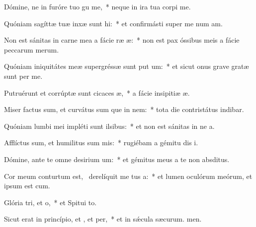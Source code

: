 \item Dómine, ne in furóre tuo gu me,~* neque in ira tua corpi me.
\item Quóniam sagíttæ tuæ inxæ sunt hi:~* et confirmásti super me num am.
\item Non est sánitas in carne mea a fácie ræ æ:~* non est pax óssibus meis a fácie peccarum merum.
\item Quóniam iniquitátes meæ supergréssæ sunt put um:~* et sicut onus grave gratæ sunt per me.
\item Putruérunt et corrúptæ sunt cicaces æ,~* a fácie insipitiæ æ.
\item Miser factus sum, et curvátus sum que in nem:~* tota die contristátus indibar.
\item Quóniam lumbi mei impléti sunt ilsibus:~* et non est sánitas in ne a.
\item Afflíctus sum, et humilitus sum mis:~* rugiébam a gémitu dis i.
\item Dómine, ante te omne desirium um:~* et gémitus meus a te non  absditus.
\item Cor meum conturtum est,~\pscross{} derelíquit me tus a:~* et lumen oculórum meórum, et ipsum  est cum.
\item Glória tri, et o,~* et Spitui to.
\item Sicut erat in princípio, et , et per,~* et in sǽcula sæcurum. men.
